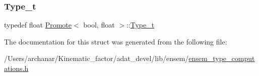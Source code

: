 \subsubsection{\texorpdfstring{Type\_t}{Type\_t}\hspace{0.1cm}{\footnotesize\ttfamily [2/2]}}
{\footnotesize\ttfamily typedef float \mbox{\hyperlink{structPromote}{Promote}}$<$ bool, float $>$\+::\mbox{\hyperlink{structPromote_3_01bool_00_01float_01_4_aa820b07e23d2dd7eee4a2344e3598502}{Type\+\_\+t}}}



The documentation for this struct was generated from the following file\+:\begin{DoxyCompactItemize}
\item 
/\+Users/archanar/\+Kinematic\+\_\+factor/adat\+\_\+devel/lib/ensem/\mbox{\hyperlink{lib_2ensem_2ensem__type__computations_8h}{ensem\+\_\+type\+\_\+computations.\+h}}\end{DoxyCompactItemize}

